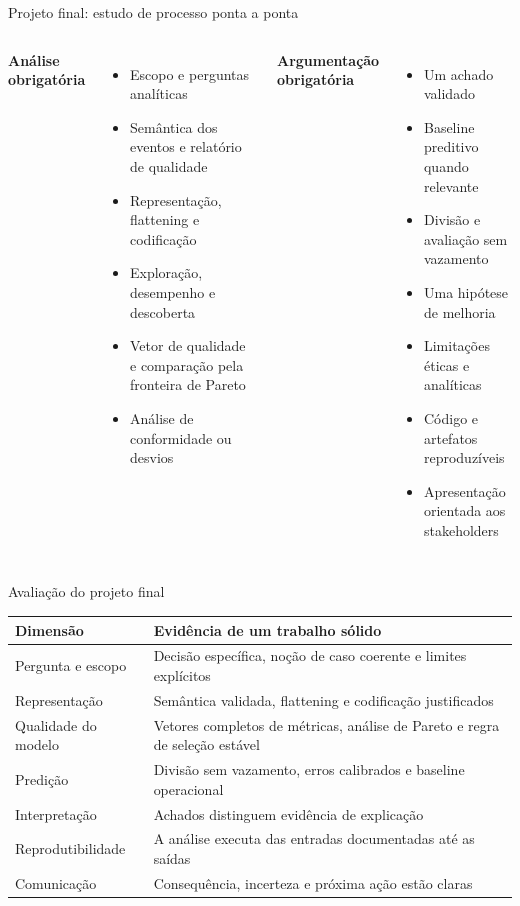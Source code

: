 \documentclass[aspectratio=169,11pt]{beamer}
\begin{document}
\begin{frame}{Projeto final: estudo de processo ponta a ponta}
  \begin{columns}[T,onlytextwidth]
      \textbf{Análise obrigatória}
      \begin{itemize}
        \item Escopo e perguntas analíticas
        \item Semântica dos eventos e relatório de qualidade
        \item Representação, flattening e codificação
        \item Exploração, desempenho e descoberta
        \item Vetor de qualidade e comparação pela fronteira de Pareto
        \item Análise de conformidade ou desvios
      \end{itemize}
      \textbf{Argumentação obrigatória}
      \begin{itemize}
        \item Um achado validado
        \item Baseline preditivo quando relevante
        \item Divisão e avaliação sem vazamento
        \item Uma hipótese de melhoria
        \item Limitações éticas e analíticas
        \item Código e artefatos reproduzíveis
        \item Apresentação orientada aos stakeholders
      \end{itemize}
  \end{columns}
\end{frame}

\begin{frame}{Avaliação do projeto final}
  \small
  \begin{tabular}{@{}p{}p{}@{}}
    \toprule
    Dimensão & Evidência de um trabalho sólido\\
    \midrule
    Pergunta e escopo & Decisão específica, noção de caso coerente e limites explícitos\\
    Representação & Semântica validada, flattening e codificação justificados\\
    Qualidade do modelo & Vetores completos de métricas, análise de Pareto e regra de seleção estável\\
    Predição & Divisão sem vazamento, erros calibrados e baseline operacional\\
    Interpretação & Achados distinguem evidência de explicação\\
    Reprodutibilidade & A análise executa das entradas documentadas até as saídas\\
    Comunicação & Consequência, incerteza e próxima ação estão claras\\
    \bottomrule
  \end{tabular}
\end{frame}
\end{document}

